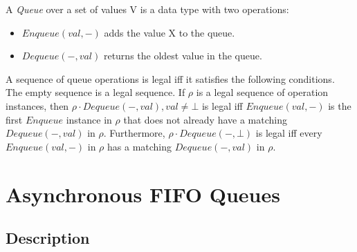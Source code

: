 \documentclass[a4paper,USenglish]{lipics-v2021} %
\begin{document}
\begin{definition} A \emph{Queue} over a set of values V is a data type with two operations:
  \begin{itemize}
  \item $Enqueue(val,-)$ adds the value X to the queue.
  \item $Dequeue(-, val)$ returns the oldest value in the queue.
  \end{itemize}

  A sequence of queue operations is legal iff it satisfies the following conditions.  The empty sequence is a legal sequence.  If $\rho$ is a legal sequence of operation instances, then $\rho \cdot Dequeue(-, val), val \neq \bot$ is legal iff $Enqueue(val, -)$ is the first $Enqueue$ instance in $\rho$ that does not already have a matching $Dequeue(-, val)$ in $\rho$. Furthermore, $\rho \cdot Dequeue(-, \bot)$ is legal iff every $Enqueue(val, -)$ in $\rho$ has a matching $Dequeue(-,val)$ in $\rho$.
\end{definition}

\section{Asynchronous FIFO Queues}

\subsection{Description}
\end{document}
